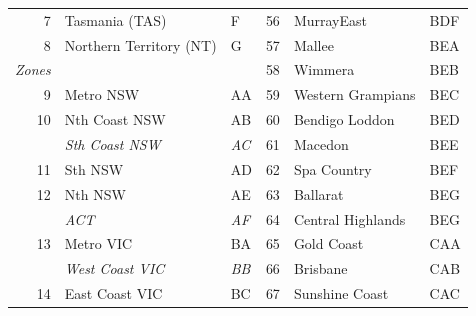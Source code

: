 \documentclass[a4paper,11pt]{article}
\theoremstyle{definition}
\begin{document}
\begin{table}[H]
\begin{tabular}{r l l|r l l}
		7                                    & Tasmania (TAS)          & F              & 56                                              & MurrayEast                      & BDF            \\
		8                                    & Northern Territory (NT) & G              & 57                                              & Mallee                          & BEA            \\
		\cline{1-3}
		\multicolumn{1}{l}{\textit{Zones}}   &                         &                & 58                                              & Wimmera                         & BEB            \\
		9                                    & Metro NSW               & AA             & 59                                              & Western Grampians               & BEC            \\
		10                                   & Nth Coast NSW           & AB             & 60                                              & Bendigo Loddon                  & BED            \\
		                                     & \textit{Sth Coast NSW}  & \textit{AC}    & 61                                              & Macedon                         & BEE            \\
		11                                   & Sth NSW                 & AD             & 62                                              & Spa Country                     & BEF            \\
		12                                   & Nth NSW                 & AE             & 63                                              & Ballarat                        & BEG            \\
		                                     & \textit{ACT}            & \textit{AF}    & 64                                              & Central Highlands               & BEG            \\
		13                                   & Metro VIC               & BA             & 65                                              & Gold Coast                      & CAA            \\
		                                     & \textit{West Coast VIC} & \textit{BB}    & 66                                              & Brisbane                        & CAB            \\
		14                                   & East Coast VIC          & BC             & 67                                              & Sunshine Coast                  & CAC            \\

\end{tabular}
\end{table}
\end{document}
